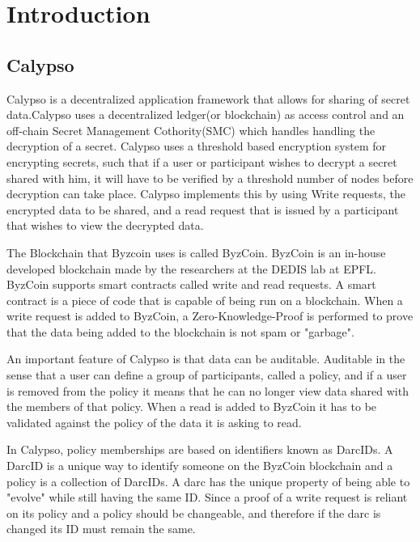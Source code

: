 \documentclass[12pt]{article}
\begin{document}
\section{Introduction}

\subsection{Calypso}

Calypso\cite{cryptoeprint:2018:209} is a decentralized application framework that allows for sharing of secret data.Calypso\cite{cryptoeprint:2018:209} uses a decentralized ledger(or blockchain) as access control and an off-chain Secret Management Cothority(SMC) which handles handling the decryption of a secret. Calypso uses a threshold based encryption system for encrypting secrets, such that if a user or participant wishes to decrypt a secret shared with him, it will have to be verified by a threshold number of nodes before decryption can take place. Calypso implements this by using Write requests, the encrypted data to be shared, and a read request that is issued by a participant that wishes to view the decrypted data.

The Blockchain that Byzcoin uses is called ByzCoin. ByzCoin is an in-house developed blockchain made by the researchers at the DEDIS lab at EPFL. ByzCoin supports smart contracts called write and read requests. A smart contract is a piece of code that is capable of being run on a blockchain. When a write request is added to ByzCoin, a Zero-Knowledge-Proof is performed to prove that the data being added to the blockchain is not spam or "garbage". 

An important feature of Calypso is that data can be auditable. Auditable in the sense that a user can define a group of participants, called a policy, and if a user is removed from the policy it means that he can no longer view data shared with the members of that policy. When a read is added to ByzCoin it has to be validated against the policy of the data it is asking to read.

In Calypso, policy memberships are based on identifiers known as DarcIDs. A DarcID is a unique way to identify someone on the ByzCoin blockchain and a policy is a collection of DarcIDs. A darc has the unique property of being able to "evolve" while still having the same ID. Since a proof of a write request is reliant on its policy and a policy should be changeable, and therefore if the darc is changed its ID must remain the same.
\end{document}
